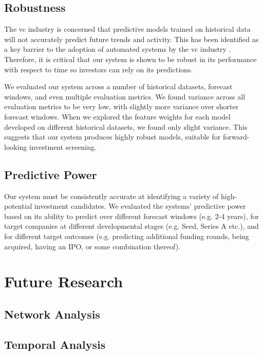 \documentclass[../thesis/thesis.tex]{subfiles}
\begin{document}
\subsection{Robustness}

The \gls{vc} industry is concerned that predictive models trained on historical data will not accurately predict future trends and activity. This has been identified as a key barrier to the adoption of automated systems by the \gls{vc} industry \cite{stone2014}. Therefore, it is critical that our system is shown to be robust in its performance with respect to time so investors can rely on its predictions. 

We evaluated our system across a number of historical datasets, forecast windows, and even multiple evaluation metrics. We found variance across all evaluation metrics to be very low, with slightly more variance over shorter forecast windows. When we explored the feature weights for each model developed on different historical datasets, we found only slight variance. This suggests that our system produces highly robust models, suitable for forward-looking investment screening.

\subsection{Predictive Power}

Our system must be consistently accurate at identifying a variety of high-potential investment candidates. We evaluated the systems' predictive power based on its ability to predict over different forecast windows (e.g. 2-4 years), for target companies at different developmental stages (e.g. Seed, Series A etc.), and for different target outcomes (e.g. predicting additional funding rounds, being acquired, having an IPO, or some combination thereof).



\section{Future Research}

\subsection{Network Analysis}


\subsection{Temporal Analysis}
\end{document}
